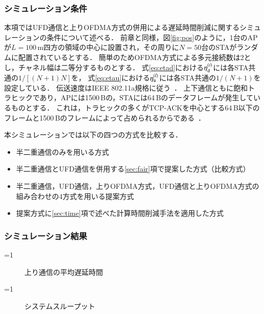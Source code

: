 \documentclass[technicalreport]{ieicej}
\newcounter{flagFig}
\begin{document}
				\subsubsection{シミュレーション条件}
					本項ではUFD通信と上りOFDMA方式の併用による遅延時間削減に関するシミュレーションの条件について述べる．
					前章と同様，図\ref{fig:pos}のように，1台のAPが$L=100$\,m四方の領域の中心に設置され，その周りに$N=50$台のSTAがランダムに配置されているとする．
					簡単のためOFDMA方式による多元接続数は2とし，チャネル幅は二等分するものとする．
					式\eqref{eq:etad}における$\eta_{\rm d}^{(i)}$には各STA共通の$1/[(N+1)N]$を，
					式\eqref{eq:etau}における$\eta_{\rm u}^{(l)}$には各STA共通の$1/(N+1)$を設定している．
					伝送速度はIEEE 802.11a規格に従う~\cite{std}．
					上下通信ともに飽和トラヒックであり，APには1500\,Bの，STAには64\,Bのデータフレームが発生しているものとする．
					これは，トラヒックの多くがTCP-ACKを中心とする64\,B以下のフレームと1500\,Bのフレームによって占められるからである~\cite{traffic}．
					\par
					本シミュレーションでは以下の四つの方式を比較する．
					\begin{itemize}
						\item 半二重通信のみを用いる方式
						\item 半二重通信とUFD通信を併用する\ref{sec:fair}項で提案した方式（比較方式）
						\item 半二重通信，UFD通信，上りOFDMA方式，UFD通信と上りOFDMA方式の組み合わせの4方式を用いる提案方式
						\item 提案方式に\ref{sec:time}項で述べた計算時間削減手法を適用した方式
					\end{itemize}

		\subsubsection{シミュレーション結果}
			\ifnum\value{flagFig}=1 {\begin{figure}[t]
				\centering
					\caption{上り通信の平均遅延時間}
					\label{fig:delay}
			\end{figure}}\fi
			\ifnum\value{flagFig}=1 {\begin{figure}[t]
				\centering
					\caption{システムスループット}
					\label{fig:thr}
			\end{figure}}\fi
\end{document}
